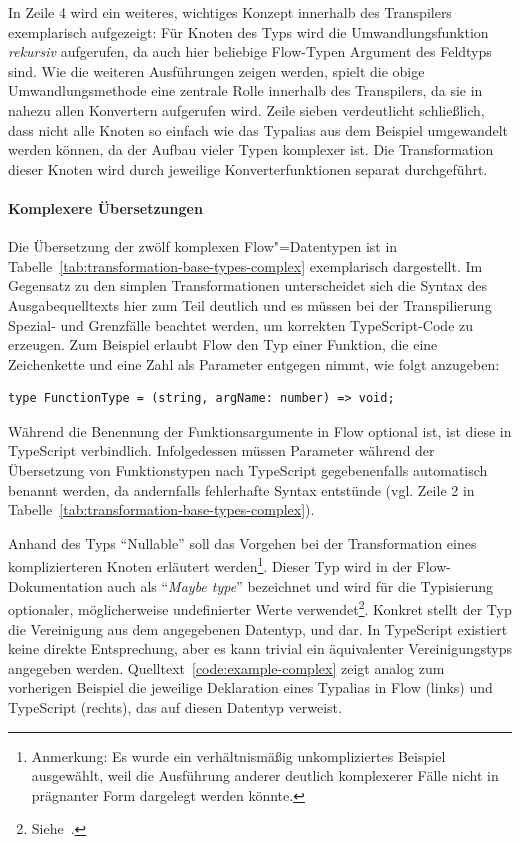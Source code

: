 {In Zeile 4 wird ein weiteres, wichtiges Konzept innerhalb des Transpilers exemplarisch aufgezeigt: Für Knoten des Typs  wird die Umwandlungsfunktion \emph{rekursiv} aufgerufen, da auch hier beliebige Flow-Typen Argument des Feldtyps sind. Wie die weiteren Ausführungen zeigen werden, spielt die obige Umwandlungsmethode eine zentrale Rolle innerhalb des Transpilers, da sie in nahezu allen Konvertern aufgerufen wird. Zeile sieben verdeutlicht schließlich, dass nicht alle Knoten so einfach wie das Typalias aus dem Beispiel umgewandelt werden können, da der Aufbau vieler Typen komplexer ist. Die Transformation dieser Knoten wird durch jeweilige Konverterfunktionen separat durchgeführt.

\paragraph{Komplexere Übersetzungen}

Die Übersetzung der zwölf komplexen Flow"=Datentypen ist in Tabelle~\ref{tab:transformation-base-types-complex} exemplarisch dargestellt. Im Gegensatz zu den simplen Transformationen unterscheidet sich die Syntax des Ausgabequelltexts hier zum Teil deutlich und es müssen bei der Transpilierung Spezial- und Grenzfälle beachtet werden, um korrekten TypeScript-Code zu erzeugen. Zum Beispiel erlaubt Flow den Typ einer Funktion, die eine Zeichenkette und eine Zahl als Parameter entgegen nimmt, wie folgt anzugeben:

\begin{lstlisting}[numbers=none]
type FunctionType = (string, argName: number) => void;
\end{lstlisting}

Während die Benennung der Funktionsargumente in Flow optional ist, ist diese in TypeScript verbindlich. Infolgedessen müssen Parameter während der Übersetzung von Funktionstypen nach TypeScript gegebenenfalls automatisch benannt werden, da andernfalls fehlerhafte Syntax entstünde (vgl. Zeile 2 in Tabelle~\ref{tab:transformation-base-types-complex}).

\bigbreak


Anhand des Typs \enquote{Nullable} soll das Vorgehen bei der Transformation eines komplizierteren Knoten erläutert werden\footnote{Anmerkung: Es wurde ein verhältnismäßig unkompliziertes Beispiel ausgewählt, weil die Ausführung anderer deutlich komplexerer Fälle nicht in prägnanter Form dargelegt werden könnte.}. Dieser Typ wird in der Flow-Dokumentation auch als \enquote{\textit{Maybe type}} bezeichnet und wird für die Typisierung optionaler, möglicherweise undefinierter Werte verwendet\footnote{Siehe~\autocite[Maybe Types]{FLOW:TYPE_ANNOTATIONS}.}. Konkret stellt der Typ die Vereinigung aus dem angegebenen Datentyp,  und  dar. In TypeScript existiert keine direkte Entsprechung, aber es kann trivial ein äquivalenter Vereinigungstyps angegeben werden. Quelltext~\ref{code:example-complex} zeigt analog zum vorherigen Beispiel die jeweilige Deklaration eines Typalias in Flow (links) und TypeScript (rechts), das auf diesen Datentyp verweist.

}
